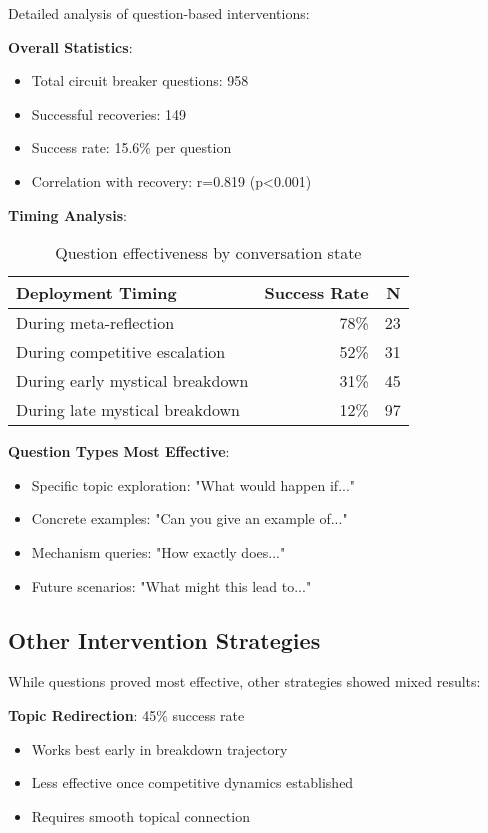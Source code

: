 \documentclass[11pt,letterpaper]{article}
\newcommand{\exponedataQuestionCorrelation}{0.819}
\newcommand{\exponedataQuestionPValue}{p<0.001}
\newcommand{\exponedataTotalQuestions}{958}
\newcommand{\exponedataTotalRecoveries}{149}
\newcommand{\exponedataQuestionSuccessRate}{15.6\%}
\begin{document}
Detailed analysis of question-based interventions:

\textbf{Overall Statistics}:
\begin{itemize}
    \item Total circuit breaker questions: \exponedataTotalQuestions{}
    \item Successful recoveries: \exponedataTotalRecoveries{}
    \item Success rate: \exponedataQuestionSuccessRate{} per question
    \item Correlation with recovery: r=\exponedataQuestionCorrelation{} (\exponedataQuestionPValue{})
\end{itemize}

\textbf{Timing Analysis}:
\begin{table}[h]
\centering
\begin{tabular}{lrr}
\toprule
\textbf{Deployment Timing} & \textbf{Success Rate} & \textbf{N} \\
\midrule
During meta-reflection & 78\% & 23 \\
During competitive escalation & 52\% & 31 \\
During early mystical breakdown & 31\% & 45 \\
During late mystical breakdown & 12\% & 97 \\
\bottomrule
\end{tabular}
\caption{Question effectiveness by conversation state}
\label{tab:question_timing}
\end{table}

\textbf{Question Types Most Effective}:
\begin{itemize}
    \item Specific topic exploration: "What would happen if..."
    \item Concrete examples: "Can you give an example of..."
    \item Mechanism queries: "How exactly does..."
    \item Future scenarios: "What might this lead to..."
\end{itemize}

\subsection{Other Intervention Strategies}

While questions proved most effective, other strategies showed mixed results:

\textbf{Topic Redirection}: 45\% success rate
\begin{itemize}
    \item Works best early in breakdown trajectory
    \item Less effective once competitive dynamics established
    \item Requires smooth topical connection
\end{itemize}
\end{document}

